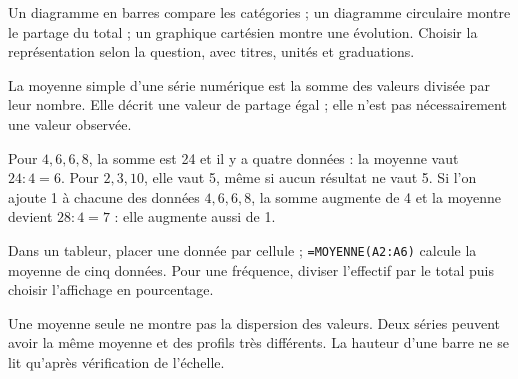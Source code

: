 \begin{savoirfaire}Un diagramme en barres compare les catégories ; un diagramme circulaire montre le partage du total ; un graphique cartésien montre une évolution. Choisir la représentation selon la question, avec titres, unités et graduations.\end{savoirfaire}
\clearpage
{}\label{cours-18-2}
\begin{definition}La moyenne simple d’une série numérique est la somme des valeurs divisée par leur nombre. Elle décrit une valeur de partage égal ; elle n’est pas nécessairement une valeur observée.\end{definition}
\begin{exemple}Pour $4,6,6,8$, la somme est 24 et il y a quatre données : la moyenne vaut $24:4=6$. Pour $2,3,10$, elle vaut 5, même si aucun résultat ne vaut 5. Si l’on ajoute 1 à chacune des données $4,6,6,8$, la somme augmente de 4 et la moyenne devient $28:4=7$ : elle augmente aussi de 1.\end{exemple}
\begin{savoirfaire}Dans un tableur, placer une donnée par cellule ; \texttt{=MOYENNE(A2:A6)} calcule la moyenne de cinq données. Pour une fréquence, diviser l’effectif par le total puis choisir l’affichage en pourcentage.\end{savoirfaire}
\begin{attention}Une moyenne seule ne montre pas la dispersion des valeurs. Deux séries peuvent avoir la même moyenne et des profils très différents. La hauteur d’une barre ne se lit qu’après vérification de l’échelle.\end{attention}

